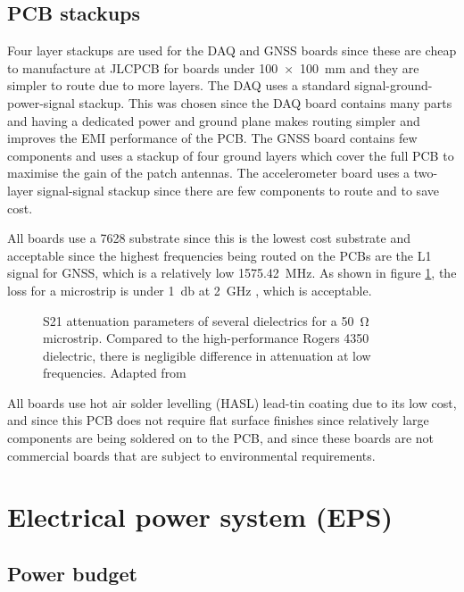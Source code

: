 \documentclass[]{report}
\begin{document}
\subsection{PCB stackups}
Four layer stackups are used for the DAQ and GNSS boards since these are cheap to manufacture at JLCPCB for boards under \SI{100x100}{\milli\meter} and they are simpler to route due to more layers. The DAQ uses a standard signal-ground-power-signal stackup. This was chosen since the DAQ board contains many parts and having a dedicated power and ground plane makes routing simpler and improves the EMI performance of the PCB. The GNSS board contains few components and uses a stackup of four ground layers which cover the full PCB to maximise the gain of the patch antennas. The accelerometer board uses a two-layer signal-signal stackup since there are few components to route and to save cost.

All boards use a 7628 substrate since this is the lowest cost substrate and acceptable since the highest frequencies being routed on the PCBs are the L1 signal for GNSS, which is a relatively low \SI{1575.42}{\mega\hertz}. As shown in figure \ref{fig:7628-fr4-loss}, the loss for a microstrip is under \SI{1}{\decibel} at \SI{2}{\giga\hertz} \cite{hamilton2007humidity}, which is acceptable.

\begin{figure}[H]
  \centering
  
  \caption{S21 attenuation parameters of several dielectrics for a \SI{50}{\ohm} microstrip. Compared to the high-performance Rogers 4350 dielectric, there is negligible difference in attenuation at low frequencies. Adapted from \cite{hamilton2007humidity}}
  \label{fig:7628-fr4-loss}
\end{figure}

All boards use hot air solder levelling (HASL) lead-tin coating due to its low cost, and since this PCB does not require flat surface finishes since relatively large components are being soldered on to the PCB, and since these boards are not commercial boards that are subject to environmental requirements.

\section{Electrical power system (EPS)}

\subsection{Power budget}
\end{document}
